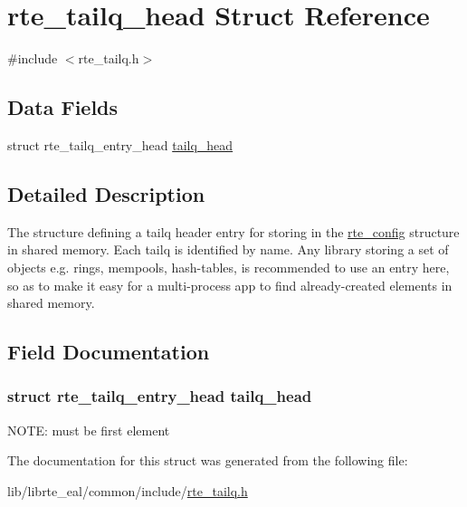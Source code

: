 \hypertarget{structrte__tailq__head}{}\section{rte\+\_\+tailq\+\_\+head Struct Reference}
\label{structrte__tailq__head}


{\ttfamily \#include $<$rte\+\_\+tailq.\+h$>$}

\subsection*{Data Fields}
\begin{DoxyCompactItemize}
\item 
struct rte\+\_\+tailq\+\_\+entry\+\_\+head \hyperlink{structrte__tailq__head_a695202b973888cfd9f8850913df7f901}{tailq\+\_\+head}
\end{DoxyCompactItemize}


\subsection{Detailed Description}
The structure defining a tailq header entry for storing in the \hyperlink{structrte__config}{rte\+\_\+config} structure in shared memory. Each tailq is identified by name. Any library storing a set of objects e.\+g. rings, mempools, hash-\/tables, is recommended to use an entry here, so as to make it easy for a multi-\/process app to find already-\/created elements in shared memory. 

\subsection{Field Documentation}
\hypertarget{structrte__tailq__head_a695202b973888cfd9f8850913df7f901}{}
\subsubsection[{tailq\+\_\+head}]{\setlength{\rightskip}{0pt plus 5cm}struct rte\+\_\+tailq\+\_\+entry\+\_\+head tailq\+\_\+head}\label{structrte__tailq__head_a695202b973888cfd9f8850913df7f901}
N\+O\+T\+E\+: must be first element 

The documentation for this struct was generated from the following file\+:\begin{DoxyCompactItemize}
\item 
lib/librte\+\_\+eal/common/include/\hyperlink{rte__tailq_8h}{rte\+\_\+tailq.\+h}\end{DoxyCompactItemize}
